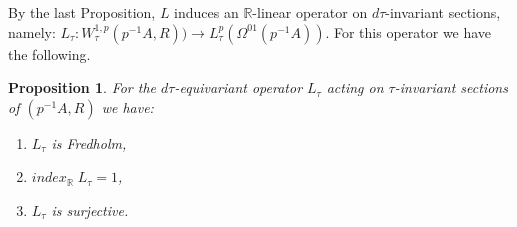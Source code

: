 \documentclass{amsart}
\newtheorem{proposition}[theorem]{Proposition}
\begin{document}
By the last Proposition, $L$ induces an ${\mathbb{R}}$-linear operator on  $ d \tau$-invariant sections, namely:
 $L_\tau:W^{1,p}_{\tau}(p^{-1}A,R))\to L^p_\tau(\Omega^{01}(p^{-1}A))$. For this operator we have the following.
\\
\begin{proposition} \label{tauequiv}
    For the $d \tau$-equivariant operator 
$L_\tau$ acting on $\tau$-invariant sections of $(p^{-1}A, R)$ we have: 
\begin{enumerate}
\item[(a)] $L_\tau$ is Fredholm,
\item[(b)] $index_{{\mathbb{R}}}\;  L_\tau=1$,
\item[(c)] $L_\tau$ is surjective. 
\end{enumerate} 
\end{proposition} 
\end{document}
